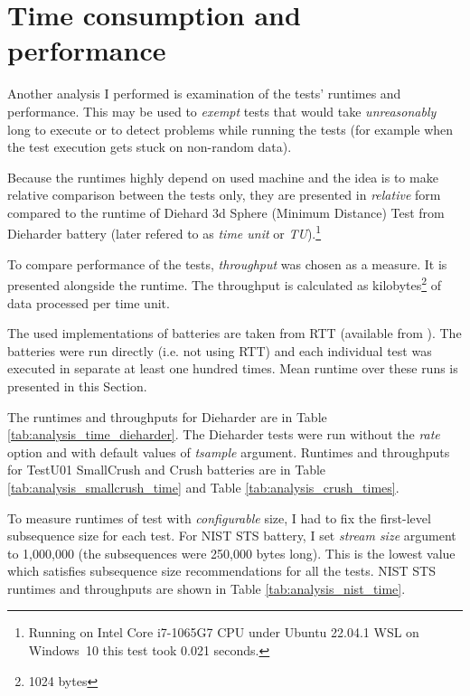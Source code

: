 \documentclass[
  digital,     %
  oneside,     %
  nosansbold,  %
  nocolorbold, %
  nolof,         %
  nolot,         %
]{fithesis4}
\begin{document}



\section{Time consumption and performance} \label{chap:analysis-times}


Another analysis I performed is examination of the tests' runtimes and performance. This may be used to \emph{exempt} tests that would take \emph{unreasonably} long to execute or to detect problems while running the tests (for example when the test execution gets stuck on non-random data).

Because the runtimes highly depend on used machine and the idea is to make relative comparison between the tests only, they are presented in \emph{relative} form compared to the runtime of Diehard 3d Sphere (Minimum Distance) Test from Dieharder battery (later refered to as \emph{time unit} or \emph{TU}).\footnote{Running on Intel Core i7-1065G7 CPU under Ubuntu 22.04.1 WSL on Windows~10 this test took 0.021 seconds.} 

To compare performance of the tests, \emph{throughput} was chosen as a measure. It is presented alongside the runtime. The throughput is calculated as kilobytes\footnote{1024 bytes} of data processed per time unit. 

The used implementations of batteries are taken from RTT (available from \cite{rtt-batteries}). The batteries were run directly (i.e. not using RTT) and each individual test was executed in separate at least one hundred times. Mean runtime over these runs is presented in this Section.

The runtimes and throughputs for Dieharder are in Table \ref{tab:analysis_time_dieharder}. The Dieharder tests were run without the \emph{rate} option and with default values of \emph{tsample} argument. Runtimes and throughputs for TestU01 SmallCrush and Crush batteries are in Table \ref{tab:analysis_smallcrush_time} and Table \ref{tab:analysis_crush_times}.

To measure runtimes of test with \emph{configurable} size, I had to fix the first-level subsequence size for each test. For NIST STS battery, I set \emph{stream size} argument to 1,000,000 (the subsequences were 250,000  bytes long). This is the lowest value which satisfies subsequence size recommendations for all the tests. \cite{nist_special} NIST STS runtimes and throughputs are shown in Table \ref{tab:analysis_nist_time}.
\end{document}
